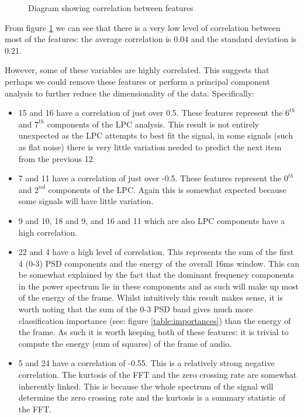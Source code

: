 \documentclass[ %
                    author={Sam Phippen},
                supervisor={Dr. Rafal Bogacz},
                     title={Real time voice activity detectors in noisy personal computing environments},
                  subtitle={},
                    degree={MEng},
                      year={2012} ]{thesis}
\begin{document}
\begin{figure}
    \caption{Diagram showing correlation between features}
    \label{fig:correlation-awesome}
\end{figure}


From figure \ref{fig:correlation-awesome} we can see that there is a very low
level of correlation between most of the features: the average correlation is
0.04 and the standard deviation is 0.21.

However, some of these variables are highly correlated. This suggests that
perhaps we could remove these features or perform a principal component
analysis to further reduce the dimensionality of the data. Specifically:

\begin{itemize}

    \item 15 and 16 have a correlation of just over 0.5. These features
        represent the $6^{th}$ and $7^{th}$ components of the LPC analysis.
        This result is not entirely unexpected as the LPC attempts to best fit
        the signal, in some signals (such as flat noise) there is very little
        variation needed to predict the next item from the previous 12.

    \item 7 and 11 have a correlation of just over -0.5. These features
        represent the $0^{th}$ and $2^{nd}$ components of the LPC. Again this
        is somewhat expected because some signals will have little variation.

    \item 9 and 10, 18 and 9, and 16 and 11 which are also LPC components
        have a high correlation.

    \item 22 and 4 have a high level of correlation. This represents the sum of
        the first 4 (0-3) PSD components and the energy of the overall 16ms
        window. This can be somewhat explained by the fact that the dominant
        frequency components in the power spectrum lie in these components and
        as such will make up most of the energy of the frame. Whilst
        intuitively this result makes sense, it is worth noting that the sum of
        the 0-3 PSD band gives much more classification importance (see: figure
        \ref{table:importances}) than the energy of the frame. As such it is
        worth keeping both of these features: it is trivial to compute the
        energy (sum of squares) of the frame of audio.

    \item 5 and 24 have a correlation of -0.55. This is a relatively strong
        negative correlation. The kurtosis of the FFT and the zero crossing
        rate are somewhat inherently linked. This is because the whole spectrum
        of the signal will determine the zero crossing rate and the kurtosis
        is a summary statistic of the FFT.


\end{itemize}
\end{document}
